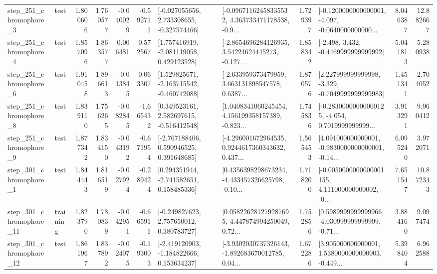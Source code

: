 \begin{tabular}{llrrrrllrlrr}
   step\_251\_chromophore\_3 &      test &      1.800606 &    1.760577 &     -0.040029 & -0.592711 &   [-0.027055656, 2.733308655, -0.327574466] &  [-0.09671162458335532, 4.363733471178538, -0.9... &       1.729397 &  [-0.1200000000000001, -4.097, -0.0640000000000... &            8.046387 &         12.882667 \\
   step\_251\_chromophore\_4 &      test &      1.857096 &    1.863577 &      0.006481 &  0.572567 &    [1.757416919, -2.081119058, 0.429123528] &  [-2.8654696284126935, 3.54224624445273, -0.127... &       1.858342 &               [-2.498, 3.432, -0.4469999999999992] &            5.041813 &          5.280938 \\
   step\_251\_chromophore\_6 &      test &      1.910458 &    1.896613 &     -0.013845 &  0.063307 &   [1.529825671, -2.163715542, -0.460742088] &  [-2.633959373479959, 3.663131898547578, 0.6387... &       1.870576 &   [2.227999999999998, -3.329, -0.7049999999999983] &            1.451341 &          2.704052 \\
   step\_251\_chromophore\_8 &      test &      1.839110 &    1.756265 &     -0.082845 & -1.665432 &    [0.349523161, 2.582697615, -0.516412548] &  [1.0408341060245454, 4.156199358157389, -0.823... &       1.745836 &  [-0.28300000000000125, -4.054, 0.7019999999999... &            3.913291 &          9.960412 \\
   step\_251\_chromophore\_9 &      test &      1.877342 &    1.834150 &     -0.043192 & -0.671954 &    [-2.767188406, 0.590946525, 0.391648685] &  [-4.296001672964535, 0.9244617360343632, 0.437... &       1.565453 &  [4.091000000000001, -0.9830000000000001, -0.14... &            6.095240 &          3.972071 \\
   step\_301\_chromophore\_1 &      test &      1.844443 &    1.816519 &     -0.027924 & -0.289424 &    [0.294351944, -2.741582651, 0.158485336] &  [0.4356398298673234, -4.433457326625798, -0.10... &       1.718200 &  [-0.0050000000000001155, 4.111000000000002, -0... &            7.651547 &         10.872343 \\
  step\_301\_chromophore\_11 &  training &      1.823790 &    1.780839 &     -0.042951 & -0.665911 &    [-0.249827623, 2.757650012, 0.380783727] &  [0.058226281279287695, 4.447874994250049, 0.72... &       1.752856 &  [0.5989999999999966, -4.030999999999999, -0.71... &            3.884160 &          9.097474 \\
  step\_301\_chromophore\_12 &      test &      1.861967 &    1.837892 &     -0.024075 & -0.193003 &   [-2.419120903, -1.184822666, 0.153634237] &  [-3.9302030737326143, -1.892683670012785, 0.04... &       1.672286 &  [3.905000000000001, 1.5380000000000003, -0.449... &            5.398404 &          6.962588 \\

\end{tabular}
